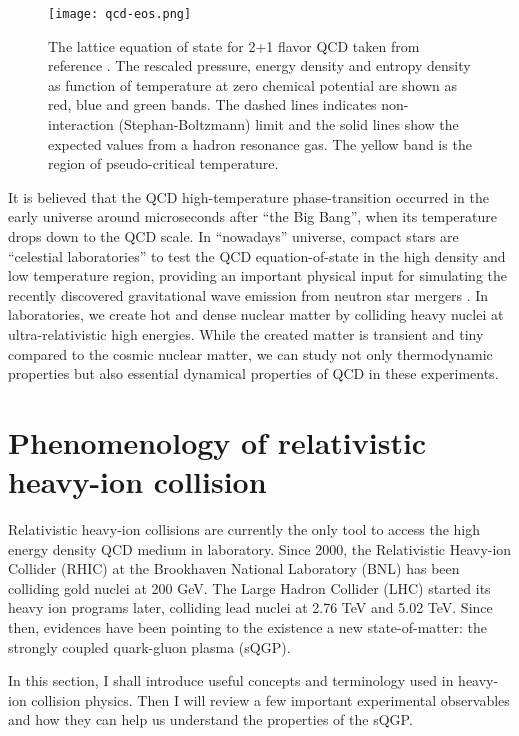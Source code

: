 \begin{figure}
\singlespacing 
    \centering
    \texttt{[image: qcd-eos.png]}
    \caption[The lattice equation of state for 2+1 flavor QCD taken from]{The lattice equation of state for 2+1 flavor QCD taken from reference \cite{Bazavov:2014pvz}. The rescaled pressure, energy density and entropy density as function of temperature at zero chemical potential are shown as red, blue and green bands. The dashed lines indicates non-interaction (Stephan-Boltzmann) limit and the solid lines show the expected values from a hadron resonance gas. The yellow band is the region of pseudo-critical temperature.}
    \label{fig:qcd_eos}
\end{figure}

It is believed that the QCD high-temperature phase-transition occurred in the early universe around microseconds after ``the Big Bang'', when its temperature drops down to the QCD scale.
In ``nowadays'' universe, compact stars are ``celestial laboratories'' to test the QCD equation-of-state in the high density and low temperature region, providing an important physical input for simulating the recently discovered gravitational wave emission from neutron star mergers \cite{TheLIGOScientific:2017qsa}.
In laboratories, we create hot and dense nuclear matter by colliding heavy nuclei at ultra-relativistic high energies.
While the created matter is transient and tiny compared to the cosmic nuclear matter, we can study not only thermodynamic properties but also essential dynamical properties of QCD in these experiments.

\section{Phenomenology of relativistic heavy-ion collision}
Relativistic heavy-ion collisions are currently the only tool to access the high energy density QCD medium in laboratory.
Since 2000, the Relativistic Heavy-ion Collider (RHIC) at the Brookhaven National Laboratory (BNL) has been colliding gold nuclei at 200 GeV. 
The Large Hadron Collider (LHC) started its heavy ion programs later, colliding lead nuclei at 2.76 TeV and 5.02 TeV.
Since then, evidences have been pointing to the existence a new state-of-matter: the strongly coupled quark-gluon plasma (sQGP).

In this section, I shall introduce useful concepts and terminology used in heavy-ion collision physics.
Then I will review a few important experimental observables and how they can help us understand the properties of the sQGP.

